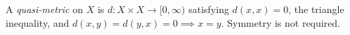 
A \emph{quasi-metric} on $X$ is $d:X\times X\to[0,\infty)$ satisfying $d(x,x)=0$, the triangle inequality, and $d(x,y)=d(y,x)=0\implies x=y$. Symmetry is not required.
